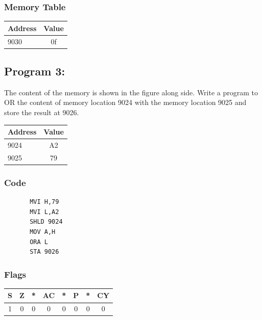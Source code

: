 \documentclass[]{report}
\begin{document}
\subsubsection {Memory Table}
\begin{tabular}{lc}
    \hline
    Address & Value  \\
    \hline
    9030       &      0f         \\
    \hline
\end{tabular}



\vspace{10mm}
\subsection*{Program 3: }
The content of the memory is shown in the figure along side. Write a program to OR the content of memory location 9024 with the memory location 9025 and store the result at 9026.
\begin{tabular}{lc}
    \hline
    Address & Value  \\
    \hline
    9024       &      A2         \\
    9025        &       79      \\
    \hline
\end{tabular}
\subsubsection{Code}
\begin{verbatim}
	   MVI H,79
	   MVI L,A2
	   SHLD 9024
	   MOV A,H
	   ORA L
	   STA 9026
\end{verbatim}
\subsubsection{Flags}
\begin{tabular}{cccccccc}
\hline
    S & Z & *  & AC & *  & P & *  & CY  \\
    \hline
    1&0&0&0&0&0&0&0 \\
    \hline
\end{tabular}
\end{document}
